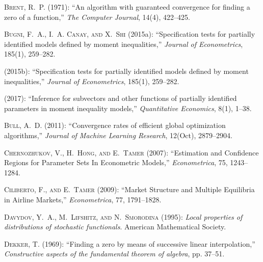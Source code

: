 \documentclass[letterpaper,11pt]{article}
\theoremstyle{myplain}
\theoremstyle{mydefinition}
\theoremstyle{myremark}
\numberwithin{equation}{section}
\numberwithin{figure}{section}
\begin{document}
\begin{thebibliography}{}
\textsc{Brent, R.~P.}  (1971): ``An algorithm with guaranteed convergence for
  finding a zero of a function,'' \emph{The Computer Journal}, 14(4), 422--425.

\textsc{Bugni, F.~A., I.~A. Canay,  {\small and} X.~Shi}  (2015a):
  ``Specification tests for partially identified models defined by moment
  inequalities,'' \emph{Journal of Econometrics}, 185(1), 259--282.

\textsc{\BySame{}}  (2015b): ``Specification tests for partially identified
  models defined by moment inequalities,'' \emph{Journal of Econometrics},
  185(1), 259--282.

\textsc{\BySame{}}  (2017): ``Inference for subvectors and other functions of
  partially identified parameters in moment inequality models,''
  \emph{Quantitative Economics}, 8(1), 1--38.

\textsc{Bull, A.~D.}  (2011): ``Convergence rates of efficient global
  optimization algorithms,'' \emph{Journal of Machine Learning Research},
  12(Oct), 2879--2904.

\textsc{Chernozhukov, V., H.~Hong,  {\small and} E.~Tamer}  (2007):
  ``Estimation and Confidence Regions for Parameter Sets In Econometric
  Models,'' \emph{Econometrica}, 75, 1243--1284.

\textsc{Ciliberto, F.,  {\small and} E.~Tamer}  (2009): ``Market Structure and
  Multiple Equilibria in Airline Markets,'' \emph{Econometrica}, 77,
  1791--1828.

\textsc{Davydov, Y.~A., M.~Lifshitz,  {\small and} N.~Smorodina}  (1995):
  \emph{Local properties of distributions of stochastic functionals}. American
  Mathematical Society.

\textsc{Dekker, T.}  (1969): ``Finding a zero by means of successive linear
  interpolation,'' \emph{Constructive aspects of the fundamental theorem of
  algebra}, pp. 37--51.


\end{thebibliography}
\end{document}
